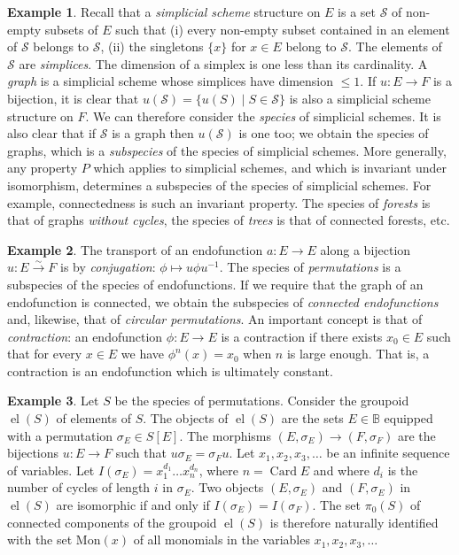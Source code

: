 \documentclass{amsart}
\theoremstyle{definition}
\newtheorem{ex}{Example}
\theoremstyle{remark}
\newcommand{\B}{\mathbb{B}}
\DeclareMathOperator{\el}{el}
\newcommand{\bij}{\stackrel{\sim}{\rightarrow}}
\DeclareMathOperator{\Card}{Card}
\newcommand{\Mon}{\mathrm{Mon}}
\newcommand{\Simp}{\mathcal{S}}
\begin{document}
\begin{ex}
  Recall that a \emph{simplicial scheme} structure on $E$ is a set
  $\Simp$ of non-empty subsets of $E$ such that (i) every non-empty
  subset contained in an element of $\Simp$ belongs to $\Simp$, (ii)
  the singletons $\{x\}$ for $x \in E$ belong to $\Simp$. The elements
  of $\Simp$ are \emph{simplices}. The dimension of a simplex is one
  less than its cardinality. A \emph{graph} is a simplicial scheme
  whose simplices have dimension $\leq 1$. If $u : E \to F$ is a
  bijection, it is clear that $u (\Simp) = \{u(S) \mid S \in \Simp\}$
  is also a simplicial scheme structure on $F$. We can therefore
  consider the \emph{species} of simplicial schemes. It is also clear
  that if $\Simp$ is a graph then $u(\Simp)$ is one too; we obtain the
  species of graphs, which is a \emph{subspecies} of the species of
  simplicial schemes. More generally, any property $P$ which applies
  to simplicial schemes, and which is invariant under isomorphism,
  determines a subspecies of the species of simplicial schemes. For
  example, connectedness is such an invariant property. The species of
  \emph{forests} is that of graphs \emph{without cycles}, the species
  of \emph{trees} is that of connected forests, etc.
\end{ex}

\begin{ex} \label{ex:endofunctions}
  The transport of an endofunction $a : E \to E$ along a bijection $u
  : E \bij F$ is by \emph{conjugation}: $\phi \mapsto u \phi
  u^{-1}$. The species of \emph{permutations} is a subspecies of the
  species of endofunctions. If we require that the graph of an
  endofunction is connected, we obtain the subspecies of
  \emph{connected endofunctions} and, likewise, that of \emph{circular
    permutations}. An important concept is that of \emph{contraction}:
  an endofunction $\phi : E \to E$ is a contraction if there exists
  $x_0 \in E$ such that for every $x \in E$ we have $\phi^n(x) = x_0$
  when $n$ is large enough. That is, a contraction is an endofunction
  which is ultimately constant.
\end{ex}

\begin{ex}
  Let $S$ be the species of permutations. Consider the groupoid $\el
  (S)$ of elements of $S$. The objects of $\el (S)$ are the sets $E
  \in \B$ equipped with a permutation $\sigma_E \in S [E]$. The
  morphisms $(E, \sigma_E) \to (F, \sigma_F)$ are the bijections $u: E
  \to F$ such that $u\sigma_E = \sigma_F u$. Let $x_1, x_2, x_3,
  \dots$ be an infinite sequence of variables.  Let $I (\sigma_E) =
  x_1^{d_1} \dots x_n^{d_n}$, where $n = \Card E$ and where $d_i$ is
  the number of cycles of length $i$ in $\sigma_E$. Two objects $(E,
  \sigma_E)$ and $(F, \sigma_E)$ in $\el (S)$ are isomorphic if and
  only if $I (\sigma_E) = I (\sigma_F)$. The set $\pi_0(S)$ of
  connected components of the groupoid $\el (S)$ is therefore
  naturally identified with the set $\Mon(x)$ of all monomials in the
  variables $x_1, x_2, x_3, \dots$
\end{ex}
\end{document}
